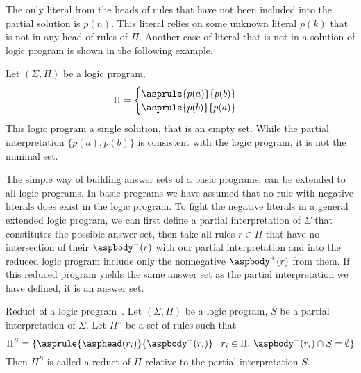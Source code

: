 The only literal from the heads of rules that have not been included
into the partial solution is $p(n)$. This literal relies
on some unknown literal $p(k)$ that is not in any head of rules of $\Pi$.
Another case of literal that is not in a solution of logic program
is shown in the following example.

\begin{example}\label{example:cycle}
    Let $(\Sigma, \Pi)$ be a logic program,
    \begin{equation*}
        \Pi =
            \begin{cases}
                \asprule{p(a)}{p(b)}\\
                \asprule{p(b)}{p(a)}\\
            \end{cases}
    \end{equation*}
    This logic program a single solution, that is an empty set.
    While the partial interpretation $\{p(a), p(b)\}$ is consistent
    with the logic program, it is not the minimal set.
\end{example}

The simple way of building answer sets of a basic programs,
can be extended to all logic programs. In basic programs we have assumed
that no rule with negative literals does exist in the logic program.
To fight the negative literals in a general extended logic program,
we can first define a partial interpretation of $\Sigma$ that constitutes
the possible answer set, then take all rules $r\in\Pi$ that have no intersection
of their $\aspbody^-(r)$ with our partial interpretation and into the reduced logic program
include only the nonnegative $\aspbody^+(r)$ from them. If this reduced program
yields the same answer set as the partial interpretation we have defined,
it is an answer set.

\begin{definition}{Reduct of a logic program~\cite{KRHandbook}.}
    Let $(\Sigma, \Pi)$ be a logic program, $S$ be a partial interpretation of $\Sigma$.
    Let $\Pi^S$ be a set of rules such that
    \begin{equation*}
        \Pi^S = \{\asprule{\asphead(r_i)}{\aspbody^+(r_i)}
                  \mid r_i\in \Pi,\,\aspbody^-(r_i)\cap S = \emptyset\}
    \end{equation*}
    Then $\Pi^S$ is called a reduct of $\Pi$ relative to the partial interpretation $S$.
\end{definition}

